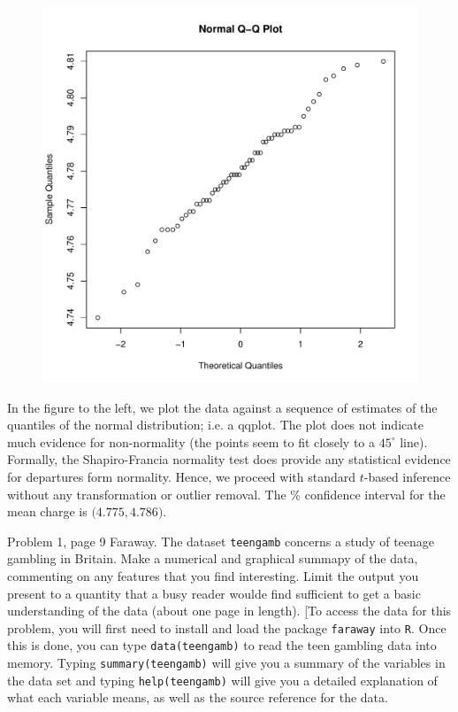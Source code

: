 \documentclass{homework}
\begin{document}
\begin{figure}
\vspace{-20pt}
\begin{center}
\includegraphics[width=.38\textwidth]{electron_normal.pdf}
\end{center}
\vspace{-20pt}
\end{figure}
  In the figure to the left, we plot the data against a sequence of estimates
  of the quantiles of the normal distribution; i.e. a qqplot.  The plot does
  not indicate much evidence for non-normality (the points seem to fit closely
  to a $45^\circ$ line). Formally, the Shapiro-Francia normality test does provide any
  statistical evidence for departures form normality.  Hence, we proceed
  with standard $t$-based inference without any transformation or outlier removal. The
  \unit[99]{\%} confidence interval for the mean charge is $\big(4.775, 4.786\big)$.

  \begin{longproblem}
  Problem 1, page 9 Faraway.  The dataset \texttt{teengamb}
  concerns a study of teenage gambling in Britain.  Make a numerical and
  graphical summapy of the data, commenting on any features that you find
  interesting.  Limit the output you present to a quantity that a busy reader
  woulde find sufficient to get a basic understanding of the data (about one
  page in length). [To access the data for this problem, you will first need to
  install and load the package \texttt{faraway} into \texttt R.  Once this is
  done, you can type \texttt{data(teengamb)} to read the teen gambling data
  into memory.  Typing \texttt{summary(teengamb)} will give you a summary of
  the variables in the data set and typing \texttt{help(teengamb)} will give
  you a detailed explanation of what each variable means, as well as the source
  reference for the data. 
  \end{longproblem}
  
\end{document}

